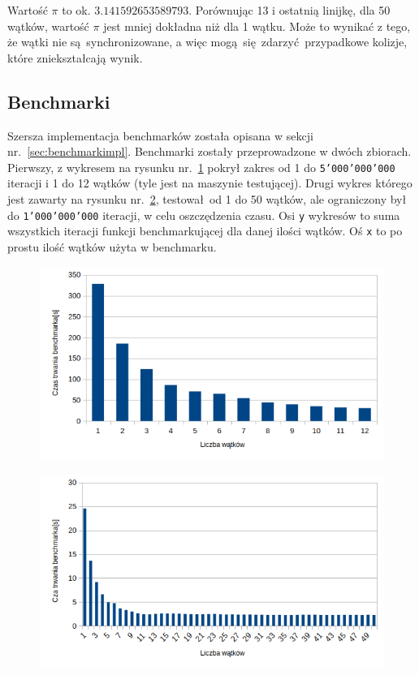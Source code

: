 Wartość $\pi$ to ok. $3.141592653589793$. Porównując 13 i ostatnią linijkę, dla 50 wątków, wartość $\pi$ jest mniej dokładna niż dla 1 wątku. Może to wynikać z tego, że wątki nie są synchronizowane, a więc mogą się zdarzyć przypadkowe kolizje, które zniekształcają wynik.

\subsection{Benchmarki}

Szersza implementacja benchmarków została opisana w sekcji nr.~\ref{sec:benchmarkimpl}. Benchmarki zostały przeprowadzone w dwóch zbiorach. Pierwszy, z wykresem na rysunku nr.~\ref{fig:benchmarklowc} pokrył zakres od 1 do \texttt{5'000'000'000} iteracji i 1 do 12 wątków (tyle jest na maszynie testującej). Drugi wykres którego jest zawarty na rysunku nr.~\ref{fig:benchmarkhighc}, testował od 1 do 50 wątków, ale ograniczony był do \texttt{1'000'000'000} iteracji, w celu oszczędzenia czasu. Osi \texttt{y} wykresów to suma wszystkich iteracji funkcji benchmarkującej dla danej ilości wątków. Oś \texttt{x} to po prostu ilość wątków użyta w benchmarku.

\begin{figure}[H]
	\centering
	\includegraphics[width=1\textwidth]{images/benchmarks_lowc.png}
	\caption{}
	\label{fig:benchmarklowc}
\end{figure}

\begin{figure}[H]
	\centering
	\includegraphics[width=1\textwidth]{images/benchmarks_highc.png}
	\caption{}
	\label{fig:benchmarkhighc}
\end{figure}

